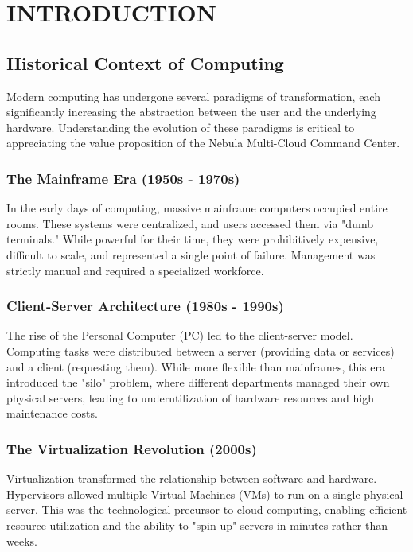 \chapter{INTRODUCTION}

\section{Historical Context of Computing}
Modern computing has undergone several paradigms of transformation, each significantly increasing the abstraction between the user and the underlying hardware. Understanding the evolution of these paradigms is critical to appreciating the value proposition of the Nebula Multi-Cloud Command Center. 

\subsection{The Mainframe Era (1950s - 1970s)}
In the early days of computing, massive mainframe computers occupied entire rooms. These systems were centralized, and users accessed them via "dumb terminals." While powerful for their time, they were prohibitively expensive, difficult to scale, and represented a single point of failure. Management was strictly manual and required a specialized workforce.

\subsection{Client-Server Architecture (1980s - 1990s)}
The rise of the Personal Computer (PC) led to the client-server model. Computing tasks were distributed between a server (providing data or services) and a client (requesting them). While more flexible than mainframes, this era introduced the "silo" problem, where different departments managed their own physical servers, leading to underutilization of hardware resources and high maintenance costs.

\subsection{The Virtualization Revolution (2000s)}
Virtualization transformed the relationship between software and hardware. Hypervisors allowed multiple Virtual Machines (VMs) to run on a single physical server. This was the technological precursor to cloud computing, enabling efficient resource utilization and the ability to "spin up" servers in minutes rather than weeks.


